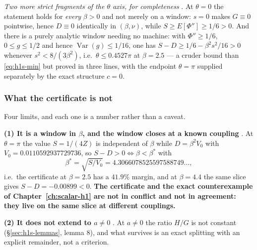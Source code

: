
\emph{Two more strict fragments of the $\theta$ axis, for completeness} \LT. At $\theta=0$ the
statement holds for \emph{every} $\beta>0$ and not merely on a window: $s=0$ makes $G\equiv0$
pointwise, hence $D\equiv0$ identically in $(\beta,\nu)$, while $S\ge E[\Phi'']\ge1/6>0$. And there is
a purely analytic window needing no machine: with $\Phi''\ge1/6$, $0\le g\le1/2$ and hence
$\operatorname{Var}(g)\le1/16$, one has $S-D\ge1/6-\beta^{2}s^{2}/16>0$ whenever
$s^{2}<8/(3\beta^{2})$, i.e.\ $\theta\le0.4527\pi$ at $\beta=2.5$ --- a cruder bound than
\eqref{eq:h1s-min} but proved in three lines, with the endpoint $\theta=\pi$ supplied separately by
the exact structure $c=0$.


\subsubsection*{What the certificate is not}

Four limits, and each one is a number rather than a caveat.

\textbf{(1) It is a window in $\beta$, and the window closes at a known coupling} \LT. At $\theta=\pi$
the value $S=1/(4Z)$ is independent of $\beta$ while $D=\beta^{2}V_{0}$ with
$V_{0}=0.0110592937729736$, so $S-D>0\iff\beta<\beta^{*}$ with
\begin{equation}
\beta^{*}=\sqrt{S/V_{0}}=4.3066078525597588749\ldots,
\label{eq:h1s-betastar}
\end{equation}
i.e.\ the certificate at $\beta=2.5$ has a $41.9\%$ margin, and at $\beta=4.4$ the same slice gives
$S-D=-0.00899<0$. \textbf{The certificate and the exact counterexample of
Chapter~\ref{ch:scalar-h1} are not in conflict and not in agreement: they live on the same slice at
different couplings.}

\textbf{(2) It does not extend to $a\neq0$} \LM. At $a\neq0$ the ratio $H/G$ is not constant
(\S\ref{sec:h1s-lemmas}, lemma 8), and what survives is an exact splitting with an explicit remainder,
not a criterion.


